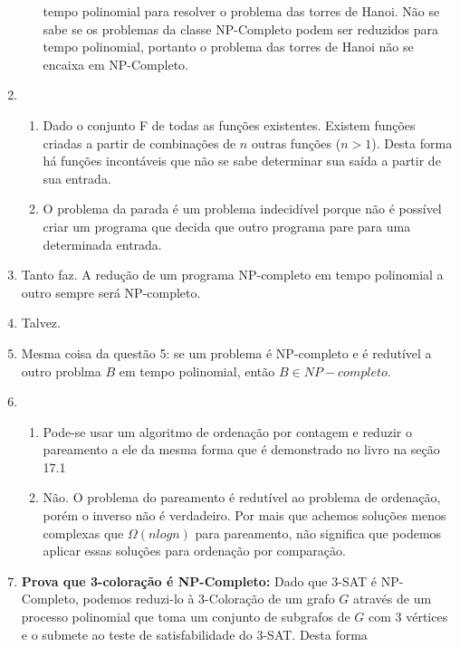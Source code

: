 \documentclass[11pt]{article}
\begin{document}
\begin{enumerate}
\begin{enumerate}
                tempo polinomial para resolver o problema das torres de Hanoi.
                Não se sabe se os problemas da classe NP-Completo podem ser
                reduzidos para tempo polinomial, portanto o problema das torres
                de Hanoi não se encaixa em NP-Completo.
        \end{enumerate}
    \item
        \begin{enumerate}
            \item Dado o conjunto F de todas as funções existentes. Existem
                funções criadas a partir de combinações de $n$ outras funções
                ($n > 1$). Desta forma há funções incontáveis que não se sabe
                determinar sua saída a partir de sua entrada.
            \item O problema da parada é um problema indecidível porque não é
                possível criar um programa que decida que outro programa pare
                para uma determinada entrada.
        \end{enumerate}
    \item Tanto faz. A redução de um programa NP-completo em tempo polinomial a
        outro sempre será NP-completo.
    \item Talvez.
    \item Mesma coisa da questão 5: se um problema é NP-completo e é redutível
        a outro problma $B$ em tempo polinomial, então $B \in NP-completo$.
    \item
        \begin{enumerate}
            \item Pode-se usar um algoritmo de ordenação por contagem e reduzir
                o pareamento a ele da mesma forma que é demonstrado no livro na
                seção 17.1
            \item Não. O problema do pareamento é redutível ao problema de
                ordenação, porém o inverso não é verdadeiro. Por mais que
                achemos soluções menos complexas que $\Omega(nlogn)$ para
                pareamento, não significa que podemos aplicar essas soluções
                para ordenação por comparação.
        \end{enumerate}
    \item \textbf{Prova que 3-coloração é NP-Completo:} Dado que 3-SAT é
        NP-Completo, podemos reduzi-lo à 3-Coloração de um grafo $G$ através de
        um processo polinomial que toma um conjunto de subgrafos de $G$ com 3
        vértices e o submete ao teste de satisfabilidade do 3-SAT. Desta forma

\end{enumerate}
\end{document}
